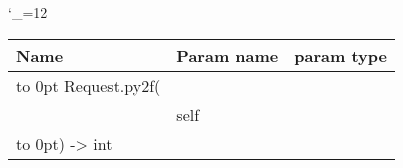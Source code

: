 \begingroup \catcode`\_=12 \tt
\begin{tabular}{lll}
\toprule
\textrm{Name}&\textrm{Param name}&\textrm{param type}\\
\midrule
\hbox to 0pt {Request.py2f(\hss}\\
& self\\
\hbox to 0pt{) -> int\hss}\\
\bottomrule
\end{tabular}
\endgroup
